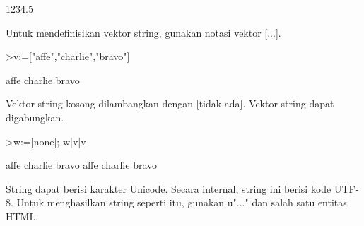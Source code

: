 \documentclass{article}
\begin{document}
\begin{eulernotebook}
\begin{euleroutput}
  1234.5
\end{euleroutput}
\begin{eulercomment}
Untuk mendefinisikan vektor string, gunakan notasi vektor [...].
\end{eulercomment}
\begin{eulerprompt}
>v:=["affe","charlie","bravo"]
\end{eulerprompt}
\begin{euleroutput}
  affe
  charlie
  bravo
\end{euleroutput}
\begin{eulercomment}
Vektor string kosong dilambangkan dengan [tidak ada]. Vektor string
dapat digabungkan.
\end{eulercomment}
\begin{eulerprompt}
>w:=[none]; w|v|v
\end{eulerprompt}
\begin{euleroutput}
  affe
  charlie
  bravo
  affe
  charlie
  bravo
\end{euleroutput}
\begin{eulercomment}
String dapat berisi karakter Unicode. Secara internal, string ini
berisi kode UTF-8. Untuk menghasilkan string seperti itu, gunakan
u"..." dan salah satu entitas HTML.


\end{eulercomment}
\end{eulernotebook}
\end{document}
